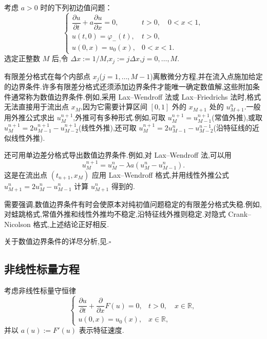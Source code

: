 \begin{note}
考虑 \(a>0\) 时的下列初边值问题：
\[
  \begin{cases}
    \dfrac{\partial u}{\partial t}+a\dfrac{\partial u}{\partial x}=0,
        & t>0,\quad 0<x<1,\\[2pt]
    u(t,0)=\varphi_-(t), & t>0,\\
    u(0,x)=u_0(x), & 0<x<1.
  \end{cases}
\]
选定正整数 \(M\) 后,令 \(\Delta x:=1/M\),\(x_j:=j\Delta x\),\(j=0,\ldots,M\).

有限差分格式在每个内部点 \(x_j\)(\(j=1,\ldots,M-1\))离散微分方程,并在流入点施加给定的边界条件.许多有限差分格式还须添加边界条件才能唯一确定数值解,这些附加条件通常称为{\heiti 数值边界条件}.例如,采用 Lax--Wendroff 法或 Lax--Friedrichs 法时,格式无法直接用于流出点 \(x_M\),因为它需要计算区间 \([0,1]\) 外的 \(x_{M+1}\) 处的 \(u_{M+1}^n\).一般用外推公式求出 \(u_M^{n+1}\),外推可有多种形式.例如,可取 \(u_M^{n+1}=u_{M-1}^{n+1}\)(常值外推),或取 \(u_M^{n+1}=2u_{M-1}^{n+1}-u_{M-2}^{n+1}\)(线性外推),还可取 \(u_M^{n+1}=2u_{M-1}^n-u_{M-2}^{n-1}\)(沿特征线的近似线性外推).

还可用单边差分格式导出数值边界条件.例如,对 Lax--Wendroff 法,可以用
\[
  u_M^{n+1}=u_M^n-\lambda a(u_M^n-u_{M-1}^n).
\]
这是在流出点 \((t_{n+1},x_M)\) 应用 Lax--Wendroff 格式,并用线性外推公式 \(u_{M+1}^n=2u_M^n-u_{M-1}^n\) 计算 \(u_{M+1}^n\) 得到的.

需要强调,数值边界条件有时会使原本对纯初值问题稳定的有限差分格式失稳.例如,对蛙跳格式,常值外推和线性外推均不稳定,沿特征线外推则稳定.对隐式 Crank--Nicolson 格式,上述结论正好相反.

关于数值边界条件的详尽分析,见.\hfill\(\square\)
\end{note}

\subsection{非线性标量方程}\label{sec:14.2.3}

考虑非线性标量守恒律
\begin{equation}\label{eq:14.2.18}
  \begin{cases}
    \dfrac{\partial u}{\partial t}+\dfrac{\partial}{\partial x}F(u)=0,
       &t>0,\quad x\in\mathbb R,\\[2pt]
    u(0,x)=u_0(x), &x\in\mathbb R,
  \end{cases}
\end{equation}
并以 \(a(u):=F'(u)\) 表示特征速度.

